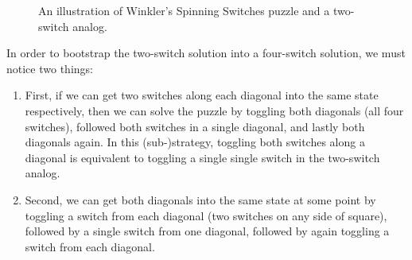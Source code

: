 \begin{figure}
  \center
  \caption[Illustration of Winkler's Spinning Switches and a two-switch analog.]{
    An illustration of Winkler's Spinning Switches puzzle and a two-switch analog.
  }
  \label{fig:twoSwitches}
\end{figure}

In order to bootstrap the two-switch solution into a four-switch solution,
we must notice two things: \begin{enumerate}
  \item First, if we can get two switches along each diagonal into the same state
  respectively, then we can solve the puzzle by toggling both diagonals
  (all four switches),
  followed both switches in a single diagonal,
  and lastly both diagonals again.
  In this (sub-)strategy, toggling both switches along a diagonal is
  equivalent to toggling a single single switch in the two-switch analog.

  \item Second, we can get both diagonals into the same state at some point
  by toggling a switch from each diagonal (two switches on any side of square),
  followed by a single switch from one diagonal,
  followed by again toggling a switch from each diagonal.
\end{enumerate}

